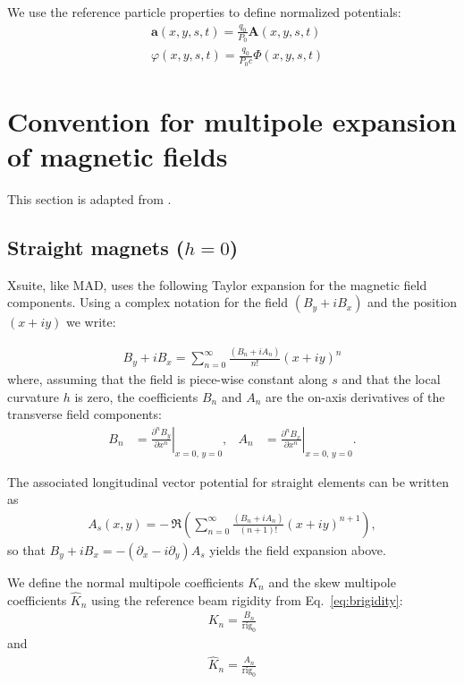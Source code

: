 We use the reference particle properties to define normalized potentials:
\begin{align}
  &\mathbf{a}(x,y,s,t) = \frac{q_0}{P_0} \mathbf{A}(x,y,s,t)\\
  &\varphi(x,y,s,t) =
    \frac{q_0}{P_0c}\Phi(x,y,s,t)
\end{align}



\section{Convention for multipole expansion of magnetic fields}
\label{sec:multipole_expansion}

This section is adapted from \cite{madsite}.

\subsection{Straight magnets ($h=0$)}

Xsuite, like MAD, uses the following Taylor expansion for the magnetic field components.
Using a complex notation for the field $(B_y+i B_x)$ and the position $(x+i y)$ we write:

\begin{align}
  B_y+i B_x=\sum_{n=0}^{\infty} \frac{(B_n+i A_n)}{n !}(x+i y)^{n}
\end{align}
where, assuming that the field is piece-wise constant along $s$ and that the local
curvature $h$ is zero, the coefficients $B_n$ and $A_n$ are the on-axis
derivatives of the transverse field components:
\begin{align}
  B_n &= \left.\frac{\partial^n B_y}{\partial x^n}\right|_{x=0,\,y=0}, &
  A_n &= \left.\frac{\partial^n B_x}{\partial x^n}\right|_{x=0,\,y=0}.
\end{align}

The associated longitudinal vector potential for straight elements can be written as
\begin{align}
  A_s(x,y) = -\,\Re\left(\sum_{n=0}^{\infty} \frac{(B_n+i A_n)}{(n+1) !}(x+i y)^{n+1}\right),
\end{align}
so that $B_y+i B_x = -(\partial_x - i \partial_y) A_s$ yields the field expansion above.

We define the normal multipole coefficients $K_n$ and the skew multipole coefficients
$\hat{K}_n$ using the reference beam rigidity from Eq.~\eqref{eq:brigidity}:
\begin{align}
  K_n=\frac{B_n}{\mathrm{rig}_0}
\end{align}
and
\begin{align}
  \hat{K}_n=\frac{A_n}{\mathrm{rig}_0}
\end{align}


